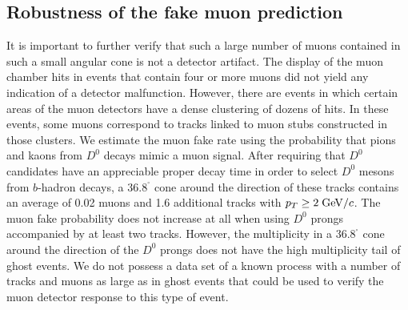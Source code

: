 \documentclass[aps,prd,preprint,floatfix,nofootinbib,superscriptaddress,showpacs,amssymb]{revtex4}
\def\deg{^\circ}
\begin{document}
\subsection{Robustness of the fake muon prediction}
\label{sec:ss-fkrob}
 It is important to further verify that such a large number of muons
 contained in such a small angular cone is not a detector artifact.
 The display of the muon chamber hits in events that contain four
 or more muons did not yield any indication of a detector malfunction.
 However, there are events in which certain areas of the muon detectors
 have a dense clustering of dozens of hits. In these events, some muons
 correspond to tracks linked to muon stubs constructed in those clusters.
 We estimate the muon fake rate using the probability that pions and kaons
 from $D^0$ decays mimic a muon signal. After requiring that $D^0$ 
 candidates have an appreciable proper decay time in order to select $D^0$
 mesons from $b$-hadron decays, a 36.8$^{\deg}$ cone around the direction
 of these tracks  contains an average of 0.02 muons and 1.6 additional
 tracks with $p_T \geq 2 \; {\rm GeV/}c$. The muon fake probability does not
 increase at all when using $D^0$ prongs accompanied by at least two tracks.
 However, the  multiplicity in a 36.8$^{\deg}$ cone around the direction
 of the $D^0$ prongs does not have the high multiplicity tail of ghost 
 events. We do not possess a data set of a known process with a number
 of tracks  and muons as large as in ghost events that could be used to 
 verify the muon detector response to this type of event.
 
\end{document}
